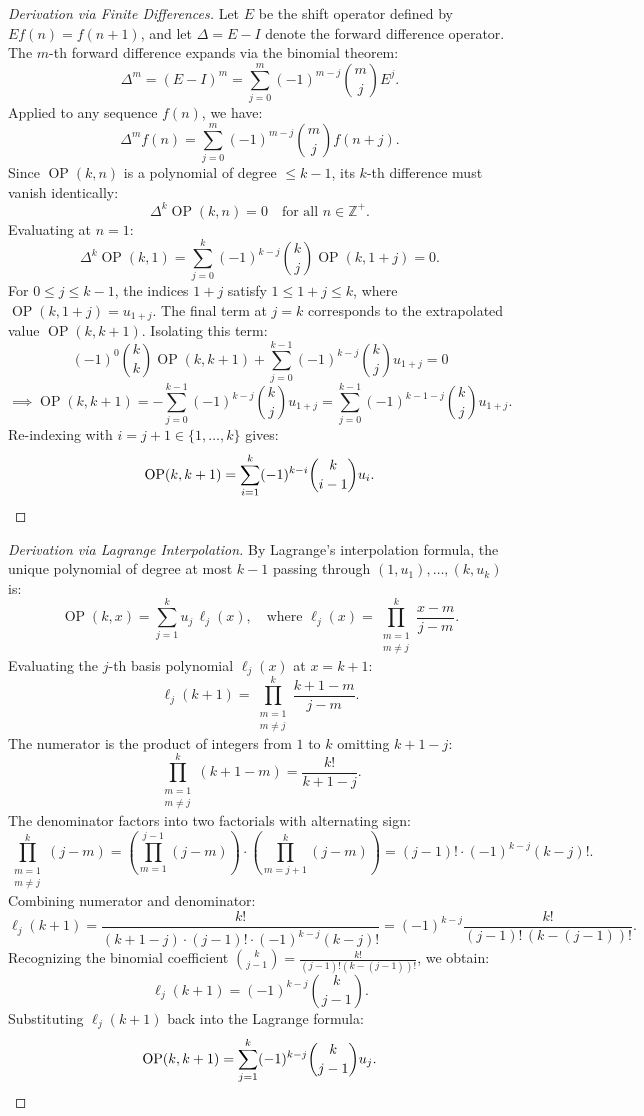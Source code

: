 \documentclass[11pt, letterpaper]{article}
\theoremstyle{plain}
\theoremstyle{definition}
\theoremstyle{remark}
\newcommand{\Z}{\mathbb{Z}}
\begin{document}
\begin{proof}[Derivation via Finite Differences]
Let $E$ be the shift operator defined by $E f(n) = f(n+1)$, and let $\Delta = E - I$ denote the forward difference operator. The $m$-th forward difference expands via the binomial theorem:
\[
    \Delta^m = (E - I)^m = \sum_{j=0}^{m} (-1)^{m-j} \binom{m}{j} E^j.
\]
Applied to any sequence $f(n)$, we have:
\[
    \Delta^m f(n) = \sum_{j=0}^m (-1)^{m-j} \binom{m}{j} f(n+j).
\]
Since $\operatorname{OP}(k, n)$ is a polynomial of degree $\le k-1$, its $k$-th difference must vanish identically:
\[
    \Delta^k \operatorname{OP}(k, n) = 0 \quad \text{for all } n \in \Z^+.
\]
Evaluating at $n = 1$:
\[
    \Delta^k \operatorname{OP}(k, 1) = \sum_{j=0}^k (-1)^{k-j} \binom{k}{j} \operatorname{OP}(k, 1+j) = 0.
\]
For $0 \le j \le k-1$, the indices $1+j$ satisfy $1 \le 1+j \le k$, where $\operatorname{OP}(k, 1+j) = u_{1+j}$. The final term at $j = k$ corresponds to the extrapolated value $\operatorname{OP}(k, k+1)$. Isolating this term:
\[
    (-1)^0 \binom{k}{k} \operatorname{OP}(k, k+1) + \sum_{j=0}^{k-1} (-1)^{k-j} \binom{k}{j} u_{1+j} = 0
\]
\[
    \implies \operatorname{OP}(k, k+1) = -\sum_{j=0}^{k-1} (-1)^{k-j} \binom{k}{j} u_{1+j} = \sum_{j=0}^{k-1} (-1)^{k-1-j} \binom{k}{j} u_{1+j}.
\]
Re-indexing with $i = j+1 \in \{1, \dots, k\}$ gives:
\[
    \operatorname{OP}(k, k+1) = \sum_{i=1}^k (-1)^{k-i} \binom{k}{i-1} u_i. \qedhere
\]
\end{proof}

\begin{proof}[Derivation via Lagrange Interpolation]
By Lagrange's interpolation formula, the unique polynomial of degree at most $k-1$ passing through $(1, u_1), \dots, (k, u_k)$ is:
\[
    \operatorname{OP}(k, x) = \sum_{j=1}^k u_j \, \ell_j(x), \quad \text{where } \ell_j(x) = \prod_{\substack{m=1 \\ m \neq j}}^k \frac{x - m}{j - m}.
\]
Evaluating the $j$-th basis polynomial $\ell_j(x)$ at $x = k+1$:
\[
    \ell_j(k+1) = \prod_{\substack{m=1 \\ m \neq j}}^k \frac{k + 1 - m}{j - m}.
\]
The numerator is the product of integers from $1$ to $k$ omitting $k+1-j$:
\[
    \prod_{\substack{m=1 \\ m \neq j}}^k (k + 1 - m) = \frac{k!}{k + 1 - j}.
\]
The denominator factors into two factorials with alternating sign:
\[
    \prod_{\substack{m=1 \\ m \neq j}}^k (j - m) = \left( \prod_{m=1}^{j-1} (j - m) \right) \cdot \left( \prod_{m=j+1}^k (j - m) \right) = (j - 1)! \cdot (-1)^{k-j} (k - j)!.
\]
Combining numerator and denominator:
\[
    \ell_j(k+1) = \frac{k!}{(k + 1 - j) \cdot (j - 1)! \cdot (-1)^{k-j} (k - j)!} = (-1)^{k-j} \frac{k!}{(j-1)! \, (k - (j-1))!}.
\]
Recognizing the binomial coefficient $\binom{k}{j-1} = \frac{k!}{(j-1)! (k - (j-1))!}$, we obtain:
\[
    \ell_j(k+1) = (-1)^{k-j} \binom{k}{j-1}.
\]
Substituting $\ell_j(k+1)$ back into the Lagrange formula:
\[
    \operatorname{OP}(k, k+1) = \sum_{j=1}^k (-1)^{k-j} \binom{k}{j-1} u_j. \qedhere
\]
\end{proof}
\end{document}
